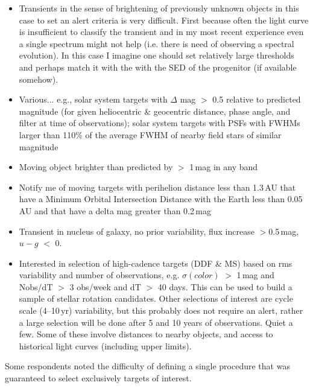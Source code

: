 \documentclass{article}
\begin{document}
\begin{itemize}
\item Transients in the sense of brightening of previously unknown objects in this case to set an alert criteria is very difficult. First because often the light curve is insufficient to classify the transient and in my most recent experience even a single spectrum might not help (i.e. there is need of observing a spectral evolution). In this case I imagine one should set relatively large thresholds and perhaps match it with the with the SED of the progenitor (if available somehow). 
\item Various... e.g., solar system targets with $\Delta$ mag $>$ 0.5 relative to predicted magnitude (for given heliocentric \& geocentric distance, phase angle, and filter at time of observations); solar system targets with PSFs with FWHMs larger than 110\% of the average FWHM of nearby field stars of similar magnitude
\item Moving object brighter than predicted by $>$ 1\,mag in any band 
\item Notify me of moving targets with perihelion distance less than 1.3\,AU that have a Minimum Orbital Intersection Distance with the Earth less than 0.05\,AU and that have a delta mag greater than 0.2\,mag
\item Transient in nucleus of galaxy, no prior variability, flux increase $>$0.5\,mag, $u-g$ $<$ 0.
\item Interested in selection of high-cadence targets (DDF \& MS) based on rms variability and number of observations, e.g. $\sigma(color)$ $>$ 1\,mag and Nobs/dT $>$ 3 obs/week and dT $>$ 40 days. This can be used to build a sample of stellar rotation candidates.  Other selections of interest are cycle scale (4--10\,yr) variability, but this probably does not require an alert, rather a large selection will be done after 5 and 10 years of observations.
Quiet a few. Some of these involve distances to nearby objects, and access to historical light curves (including upper limits).
\end{itemize}

Some respondents noted the difficulty of defining a single procedure that was guaranteed to select exclusively targets of interest.  
\end{document}
